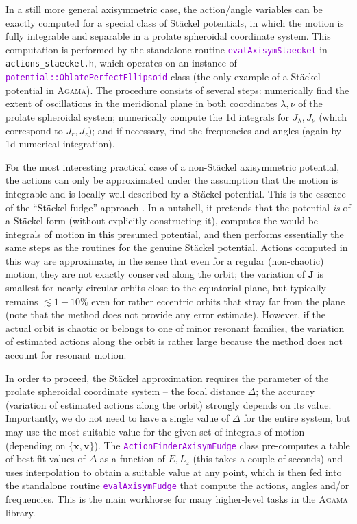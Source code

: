 \documentclass[12pt]{article}
\newcommand{\Agama}{\textsc{Agama}\xspace}
\newcommand{\ttt}[1]{\textcolor{darkviolet}{\texttt{#1}}}
\newcommand{\bv}{\boldsymbol{v}}
\newcommand{\bx}{\boldsymbol{x}}
\newcommand{\bJ}{\boldsymbol{J}}
\begin{document}
In a still more general axisymmetric case, the action/angle variables can be exactly computed for a special class of St\"ackel potentials, in which the motion is fully integrable and separable in a prolate spheroidal coordinate system. This computation is performed by the standalone routine \ttt{evalAxisymStaeckel} in \mbox{\texttt{actions_staeckel.h}}, which operates on an instance of \ttt{potential::OblatePerfectEllipsoid} class (the only example of a St\"ackel potential in \Agama). The procedure consists of several steps: numerically find the extent of oscillations in the meridional plane in both coordinates $\lambda, \nu$ of the prolate spheroidal system; numerically compute the 1d integrals for $J_\lambda, J_\nu$ (which correspond to $J_r, J_z$); and if necessary, find the frequencies and angles (again by 1d numerical integration).

For the most interesting practical case of a non-St\"ackel axisymmetric potential, the actions can only be approximated under the assumption that the motion is integrable and is locally well described by a St\"ackel potential. This is the essence of the ``St\"ackel fudge'' approach \cite{Binney2012}. In a nutshell, it pretends that the potential \textit{is} of a St\"ackel form (without explicitly constructing it), computes the would-be integrals of motion in this presumed potential, and then performs essentially the same steps as the routines for the genuine St\"ackel potential. Actions computed in this way are approximate, in the sense that even for a regular (non-chaotic) motion, they are not exactly conserved along the orbit; the variation of $\bJ$ is smallest for nearly-circular orbits close to the equatorial plane, but typically remains $\lesssim 1-10\%$ even for rather eccentric orbits that stray far from the plane (note that the method does not provide any error estimate). However, if the actual orbit is chaotic or belongs to one of minor resonant families, the variation of estimated actions along the orbit is rather large because the method does not account for resonant motion.

In order to proceed, the St\"ackel approximation requires the parameter of the prolate spheroidal coordinate system -- the focal distance $\Delta$; the accuracy (variation of estimated actions along the orbit) strongly depends on its value. Importantly, we do not need to have a single value of $\Delta$ for the entire system, but may use the most suitable value for the given set of integrals of motion (depending on $\{\bx,\bv\}$).
The \ttt{ActionFinderAxisymFudge} class pre-computes a table of best-fit values of $\Delta$ as a function of $E,L_z$ (this takes a couple of seconds) and uses interpolation to obtain a suitable value at any point, which is then fed into the standalone routine \ttt{evalAxisymFudge} that compute the actions, angles and/or frequencies.
This is the main workhorse for many higher-level tasks in the \Agama library.
\end{document}
